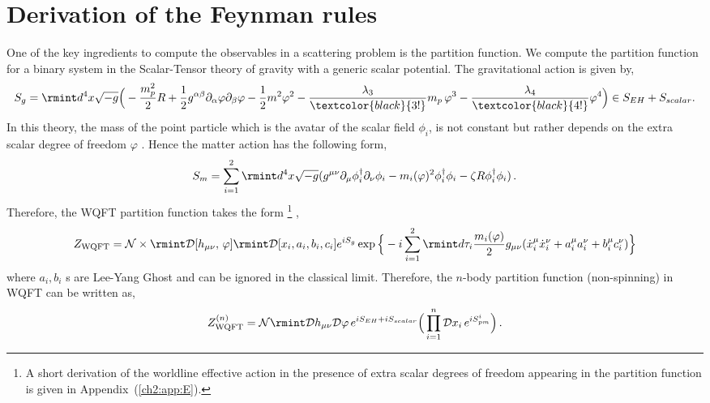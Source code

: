\section{Derivation of the Feynman rules}\label{ch2:sec3}
One of the key ingredients to compute the observables in a scattering problem is the partition function. 
We compute the partition function for a binary system in the Scalar-Tensor theory of gravity with a generic scalar potential. The gravitational action is given by,
\begin{align}
    \begin{split}
        S_{g}=\rmint d^4x \sqrt{- g}\Big(-\frac{m_p^2}{2} R+\frac{1}{2} {g}^{\alpha\beta}\partial_{\alpha}{\varphi}\partial_{\beta}{\varphi}-\frac{1}{2}m^2{\varphi}^2-\frac{\lambda_3}{\textcolor{black}{3!}} m_p\, \varphi^3-\frac{\lambda_4}{\textcolor{black}{4!}}{\varphi}^4\Big)\in S_{EH}+S_{scalar}.\label{3.1m}
    \end{split}
\end{align}
In this theory, the mass of the point particle which is the avatar of the scalar field $\phi_i$, is not constant but rather depends on the extra scalar degree of freedom $\varphi$ \cite{eardley}. Hence the matter action has the following form,
\begin{align}
    \begin{split}
        S_m=\sum_{i=1}^2\rmint d^4 x \sqrt{-g}(g^{\mu\nu}\partial_\mu\phi_i^{\dagger}\partial_\nu\phi_i-m_i(\varphi)^2\phi_i^{\dagger}\phi_i-\zeta R\phi_i^{\dagger}\phi_i)\,.
    \end{split}
\end{align}
Therefore, the WQFT partition function takes the form \footnote{A short derivation of the worldline effective action in the presence of extra scalar degrees of freedom appearing in the partition function is given in Appendix~(\ref{ch2:app:E}).} ,
\begin{align}
    \begin{split}
        {Z}_{\textrm{WQFT}}=\mathcal{N}\times \rmint \mathcal{D}[h_{\mu\nu},\,{\varphi}]\rmint \mathcal{D}[x_i,a_i,b_i,c_i]e^{iS_{g}}\exp\Big\{-i\sum_{i=1}^{2}\rmint d\tau_{i}\frac{m_i(\varphi)}{2}g_{\mu\nu}(\dot x_{i}^{\mu}\dot x_{i}^{\nu}+a_{i}^{\mu}a_{i}^{\nu}+b_{i}^{\mu}c_{i}^{\nu})\Big\}\label{3.2}
    \end{split}
\end{align}
where $a_i,b_i$ s are Lee-Yang Ghost and can be ignored in the classical limit. Therefore, the $n$-body partition function (non-spinning) in WQFT can be written as,
\begin{align}
    \begin{split}
        Z_{\textrm{WQFT}}^{(n)}=\mathcal{N}\rmint \mathcal{D}h_{\mu\nu}\mathcal{D}\varphi\,e^{iS_{EH}+iS_{scalar}}\Big(\prod_{i=1}^{n}\mathcal{D}x_{i}\,e^{iS_{pm}^i}\Big)\,.\label{3.3}
    \end{split}
\end{align}
